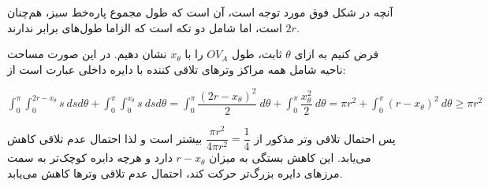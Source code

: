 \documentclass{scribe-cgenomics}
\begin{document}
\begin{حل}
آنچه در شکل فوق مورد توجه است، آن است که طول مجموع پاره‌خط سبز، هم‌چنان
$2r$
است، اما شامل دو تکه است که الزاما طول‌های برابر ندارند.

فرض کنیم به ازای
$\theta$
ثابت، طول
$OV_A$
را با
$x_{\theta}$
نشان دهیم. در این صورت مساحت ناحیه شامل همه مراکز وترهای تلاقی کننده با دایره داخلی عبارت است از:

\begin{center}
$
\int_{0}^{\pi} \int_{0}^{2r-x_{\theta}} s\ dsd\theta +
\int_{0}^{\pi} \int_{0}^{x_{\theta}} s\ dsd\theta 
= \int_{0}^{\pi} \dfrac{(2r-x_{\theta})^2}{2} \ d\theta +
\int_{0}^{\pi} \dfrac{x_{\theta}^2}{2}\ d\theta
= \pi r^2 + \int_{0}^{\pi} (r-x_{\theta})^2\ d\theta \geq \pi r^2
$
\end{center}

پس احتمال تلاقی وتر مذکور از
$\dfrac{\pi r^2}{4\pi r^2} = \dfrac{1}{4}$
بیشتر است و لذا احتمال عدم تلاقی کاهش می‌یابد. این کاهش بستگی به میزان
$r-x_{\theta}$
دارد و هرچه دایره کوچک‌تر به سمت مرزهای دایره بزرگ‌تر حرکت کند، احتمال عدم تلاقی وترها کاهش می‌یابد.


\end{حل}













\newpage
\begin{prob}
\end{prob}
\end{document}
